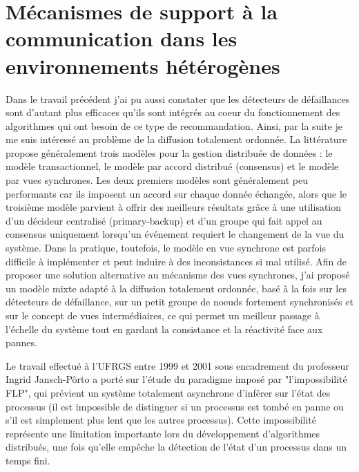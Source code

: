 \documentclass[a4paper]{book}
\begin{document}
\section{Mécanismes de support à la communication dans les environnements hétérogènes}


Dans le travail précédent j'ai pu aussi constater que les détecteurs de défaillances sont d'autant plus efficaces qu'ils sont intégrés au coeur du fonctionnement des algorithmes qui ont besoin de ce type de recommandation. Ainsi, par la suite je me suis intéressé au problème de la diffusion totalement ordonnée. La littérature propose généralement trois modèles pour la gestion distribuée de données : le modèle transactionnel, le modèle par accord distribué (consensus) et le modèle par vues synchrones. Les deux premiers modèles sont généralement peu performants car ils imposent un accord sur chaque donnée échangée, alors que le troisième modèle parvient à offrir des meilleurs résultats grâce à une utilisation d'un décideur centralisé (primary-backup) et d'un groupe qui fait appel au consensus uniquement lorsqu'un événement requiert le changement de la vue du système. Dans la pratique, toutefois, le modèle en vue synchrone est parfois difficile à implémenter et peut induire à des inconsistances si mal utilisé. Afin de proposer une solution alternative au mécanisme des vues synchrones, j'ai proposé un modèle mixte adapté à la diffusion totalement ordonnée, basé à la fois sur les détecteurs de défaillance, sur un petit groupe de noeuds fortement synchronisés et sur le concept de vues intermédiaires, ce qui permet un meilleur passage à l'échelle du système tout en gardant la consistance et la réactivité face aux pannes.      


Le travail effectué à l'UFRGS entre 1999 et 2001 sous encadrement du professeur Ingrid Jansch-Pôrto a porté sur l'étude du paradigme imposé par "l'impossibilité FLP", qui prévient un système totalement asynchrone d'inférer sur l'état des processus (il est impossible de distinguer si un processus est tombé en panne ou s'il est simplement plus lent que les autres processus). Cette impossibilité représente une limitation importante lors du développement d'algorithmes distribués, une fois qu'elle empêche la détection de l'état d'un processus dans un temps fini.
\end{document}
